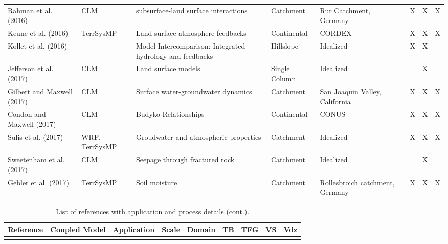 {\begin{table}
\begin{tabular}{ l  p{1.5cm} p{2cm} p{1.5cm} p{1.5cm} | c | c | c | c }
\cite{Rahman2016} Rahman et al. (2016) & CLM & subsurface-land surface interactions & Catchment & Rur Catchment, Germany & &X &X &X \\
\cite{Keune2016} Keune et al. (2016) & TerrSysMP & Land surface-atmosphere feedbacks & Continental & CORDEX & &X &X &X \\
\cite{Kollet2016} Kollet et al. (2016) &  & Model Intercomparison: Integrated hydrology and feedbacks & Hillslope & Idealized & &X &X & \\
\cite{Jefferson2017} Jefferson et al. (2017) & CLM & Land surface models & Single Column & Idealized & & &X & \\
\cite{Gilbert2017a} Gilbert and Maxwell (2017) & CLM & Surface water-groundwater dynamics & Catchment & San Joaquin Valley, California & &X &X &X \\
\cite{Condon2017} Condon and Maxwell (2017) & CLM & Budyko Relationships & Continental & CONUS & &X &X &X \\					
\cite{Sulis2017} Sulis et al. (2017) & WRF, TerrSysMP & Groudwater and atmospheric properties & Catchment & Idealized & &X &X &X \\		
\cite{Sweetenham2017} Sweetenham et al. (2017) & CLM & Seepage through fractured rock & Catchment & Idealized & & &X & \\		
\cite{Gebler2017} Gebler et al. (2017) & TerrSysMP & Soil moisture & Catchment & Rollesbroich catchment, Germany & &X &X &X \\				

\end{tabular}
\label{pfref12}
\end{table}


\begin{table} \center
\renewcommand{\arraystretch}{2.5}
\center
\caption{List of \parflow{} references with application and process details (cont.).}
\begin{tabular}{ l  p{1.5cm} p{2cm} p{1.5cm} p{1.5cm} | c | c | c | c }
\bf{Reference} & \bf{Coupled Model} & \bf{Application} & \bf{Scale} & \bf{Domain} & \bf{TB} & \bf{TFG} & \bf{VS} & \bf{Vdz} \\   
\hline{}


\end{tabular}
\end{table}}
